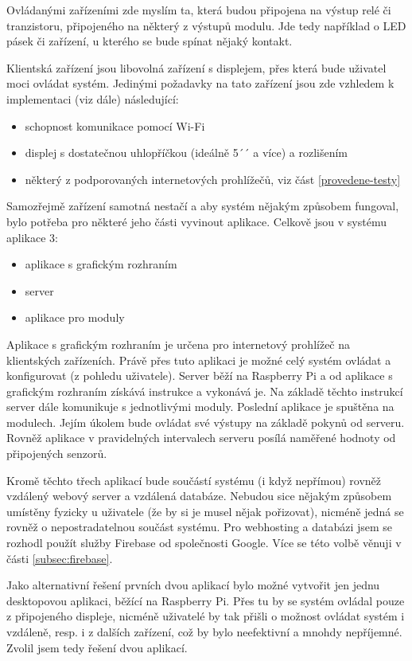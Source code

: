 Ovládanými zařízeními zde myslím ta, která budou připojena na výstup relé či tranzistoru, připojeného na některý z výstupů modulu. Jde tedy například o LED pásek či zařízení, u kterého se bude spínat nějaký kontakt. 

Klientská zařízení jsou libovolná zařízení s displejem, přes která bude uživatel moci ovládat systém. Jedinými požadavky na tato zařízení jsou zde vzhledem k implementaci (viz dále) následující:
\begin{itemize}
    \item schopnost komunikace pomocí Wi-Fi
    \item displej s dostatečnou uhlopříčkou (ideálně 5´´ a více) a rozlišením
    \item některý z podporovaných internetových prohlížečů, viz část \ref{provedene-testy} 
\end{itemize}

Samozřejmě zařízení samotná nestačí a aby systém nějakým způsobem fungoval, bylo potřeba pro některé jeho části vyvinout aplikace. Celkově jsou v systému aplikace 3:
\begin{itemize}
    \item aplikace s grafickým rozhraním
    \item server
    \item aplikace pro moduly
\end{itemize}

Aplikace s grafickým rozhraním je určena pro internetový prohlížeč na klientských zařízeních. Právě přes tuto aplikaci je možné celý systém ovládat a konfigurovat (z pohledu uživatele). 
Server běží na Raspberry Pi a od aplikace s grafickým rozhraním získává instrukce a vykonává je. Na základě těchto instrukcí server dále komunikuje s jednotlivými moduly.
Poslední aplikace je spuštěna na modulech. Jejím úkolem bude ovládat své výstupy na základě pokynů od serveru. Rovněž aplikace v pravidelných intervalech serveru posílá naměřené hodnoty od připojených senzorů.

Kromě těchto třech aplikací bude součástí systému (i když nepřímou) rovněž vzdálený webový server a vzdálená databáze. Nebudou sice nějakým způsobem umístěny fyzicky u uživatele (že by si je musel nějak pořizovat), nicméně jedná se rovněž o nepostradatelnou součást systému. Pro webhosting a databázi jsem se rozhodl použít služby Firebase od společnosti Google. Více se této volbě věnuji v části  \ref{subsec:firebase}.

Jako alternativní řešení prvních dvou aplikací bylo možné vytvořit jen jednu desktopovou aplikaci, běžící na Raspberry Pi. Přes tu by se systém ovládal pouze z připojeného displeje, nicméně uživatelé by tak přišli o možnost ovládat systém i vzdáleně, resp. i z dalších zařízení, což by bylo neefektivní a mnohdy nepříjemné. Zvolil jsem tedy řešení dvou aplikací.


